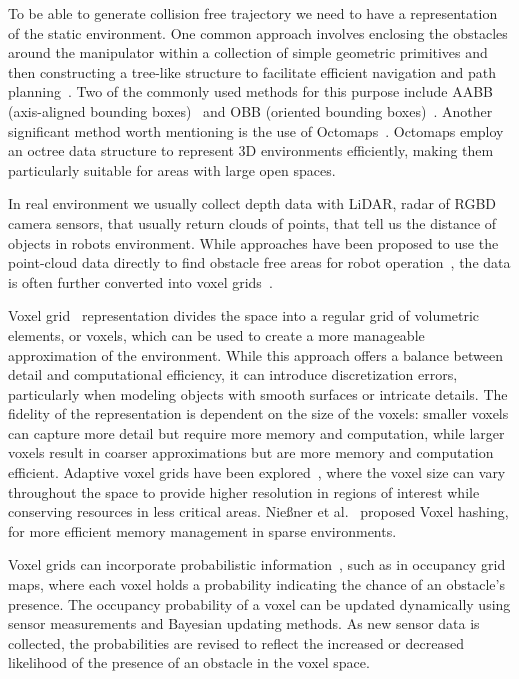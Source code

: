 \documentclass[letterpaper, 10 pt, conference]{ieeeconf}  %
\begin{document}
To be able to generate collision free trajectory we need to have a representation of the static environment. One common approach involves enclosing the obstacles around the manipulator within a collection of simple geometric primitives and then constructing a tree-like structure to facilitate efficient navigation and path planning~\cite{dai2022review}. Two of the commonly used methods for this purpose include AABB (axis-aligned bounding boxes)~\cite{vandenbergen1997efficient, chen2018path, luo2018collisionfree} and OBB (oriented bounding boxes)~\cite{gottschalk1996obbtree, puiu2011realtime}. Another significant method worth mentioning is the use of Octomaps~\cite{wurmOctoMap}. Octomaps employ an octree data structure to represent 3D environments efficiently, making them particularly suitable for areas with large open spaces. 

In real environment we usually collect depth data with LiDAR, radar of RGBD camera sensors, that usually return clouds of points, that tell us the distance of objects in robots environment. While approaches have been proposed to use the point-cloud data directly to find obstacle free areas for robot operation~\cite{gao2019flying}, the data is often further converted into voxel grids~\cite{xu2021voxel, oleynikova2017voxblox, han2019fiesta}.

Voxel grid~\cite{xu2021voxel, elfes1989using} representation divides the space into a regular grid of volumetric elements, or voxels, which can be used to create a more manageable approximation of the environment. While this approach offers a balance between detail and computational efficiency, it can introduce discretization errors, particularly when modeling objects with smooth surfaces or intricate details. The fidelity of the representation is dependent on the size of the voxels: smaller voxels can capture more detail but require more memory and computation, while larger voxels result in coarser approximations but are more memory and computation efficient. Adaptive voxel grids have been explored~\cite{xu2021voxel}, where the voxel size can vary throughout the space to provide higher resolution in regions of interest while conserving resources in less critical areas. Nießner et al.~\cite{niessner2013realtime} proposed Voxel hashing, for more efficient memory management in sparse environments. 

Voxel grids can incorporate probabilistic information~\cite{thrun2002probabilistic, dryanovski2010multivolume}, such as in occupancy grid maps, where each voxel holds a probability indicating the chance of an obstacle's presence. The occupancy probability of a voxel can be updated dynamically using sensor measurements and Bayesian updating methods. As new sensor data is collected, the probabilities are revised to reflect the increased or decreased likelihood of the presence of an obstacle in the voxel space. 
\end{document}
